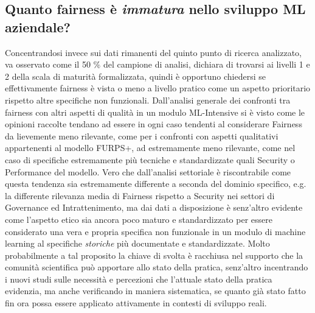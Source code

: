    \subsection{Quanto fairness è \emph{immatura} nello sviluppo ML aziendale?}
   Concentrandosi invece sui dati rimanenti del quinto punto di ricerca analizzato, va osservato come il 50 \% del campione di analisi, dichiara di trovarsi ai livelli 1 e 2 della scala di maturità formalizzata, quindi è opportuno chiedersi se effettivamente fairness è vista o meno a livello pratico come un aspetto prioritario rispetto altre specifiche non funzionali. Dall'analisi generale dei confronti tra fairness con altri aspetti di qualità in un modulo ML-Intensive si è visto come le opinioni raccolte tendano ad essere in ogni caso tendenti al considerare Fairness da lievemente meno rilevante, come per i confronti con aspetti qualitativi appartenenti al modello FURPS+, ad estremamente meno rilevante, come nel caso di specifiche estremamente più tecniche e standardizzate quali Security o Performance del modello. Vero che dall'analisi settoriale è riscontrabile come questa tendenza sia estremamente differente a seconda del dominio specifico, e.g. la differente rilevanza media di Fairness rispetto a Security nei settori di Governance ed Intrattenimento, ma dai dati a disposizione è senz'altro evidente come l'aspetto etico sia ancora poco maturo e standardizzato per essere considerato una vera e propria specifica non funzionale in un modulo di machine learning al specifiche \emph{storiche} più documentate e standardizzate. Molto probabilmente a tal proposito la chiave di svolta è racchiusa nel supporto che la comunità scientifica può apportare allo stato della pratica, senz'altro incentrando i nuovi studi sulle necessità e percezioni che l'attuale stato della pratica evidenzia, ma anche verificando in maniera sistematica, se quanto già stato fatto fin ora possa essere applicato attivamente in contesti di sviluppo reali.
    
